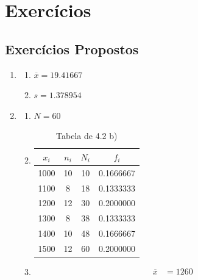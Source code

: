 \documentclass[11pt,a4paper]{report}
\begin{document}
\clearpage



\chapter{Exercícios}
\section*{Exercícios Propostos}

\begin{enumerate}[label=\arabic{chapter}.\arabic*]
	\item {}
		\begin{enumerate}[label=\alph*)]
		\item $\overline{x} = 19.41667$\hfill
			
		\item $s = 1.378954$\hfill
			
		\end{enumerate}
	\item {}\hfill
		\begin{enumerate}[label=\alph*)]
		\item $N = 60$\hfill
			
		\item \hfill
			\begin{table}[h!]
				\centering
				\begin{tabular}{|c|c|c|c|}
					\hline
					$x_i$&$n_i$&$N_i$&$f_i$ \\
					\hline
					1000&10&10&0.1666667\\
					\hline
					1100& 8&18&0.1333333\\
					\hline
					1200&12&30&0.2000000\\
					\hline
					1300& 8&38&0.1333333\\
					\hline
					1400&10&48&0.1666667\\
					\hline
					1500&12&60&0.2000000\\
					\hline
				\end{tabular}
				\caption{Tabela de 4.2 b)}
			\end{table}
			
			\clearpage
		\item \hfill
			\begin{align*}
				\overline{x} &= 1260 \\

\end{align*}
\end{enumerate}
\end{enumerate}
\end{document}
